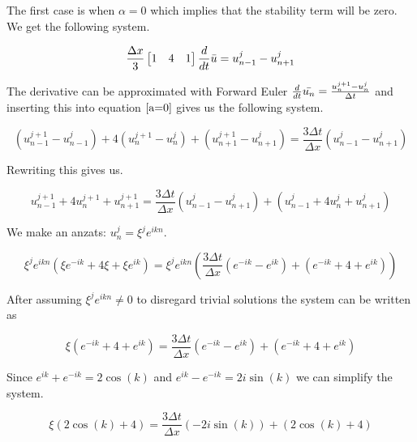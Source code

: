 \documentclass[a4paper,10pt,twoside]{article}
\begin{document}
The first case is when $\alpha = 0$ which implies that the stability term will be zero. We get the following system.

\begin{equation}
\label{a=0}
        \frac{\Delta x}{3}
    \begin{bmatrix}
        1 & 4 & 1
    \end{bmatrix}    
    \frac{d}{dt} \Bar{u} = u_{n-1}^{j} - u_{n+1}^{j}
\end{equation}

The derivative can be approximated with Forward Euler $\frac{d}{dt} \Bar{u_{n}} = \frac{u_n^{j+1} - u_n^j}{\Delta t}$ and inserting this into equation $\ref{a=0}$ gives us the following system.

\begin{equation}
        (u_{n-1}^{j+1} - u_{n-1}^j)
        +4(u_n^{j+1} - u_n^j)
        +(u_{n+1}^{j+1} - u_{n+1}^j)
    = \frac{3 \Delta t}{\Delta x}\left(u_{n-1}^{j} - u_{n+1}^{j}\right)
\end{equation}

Rewriting this gives us.

\begin{equation}
        u_{n-1}^{j+1}
        +4u_n^{j+1} 
        +u_{n+1}^{j+1}
    = \frac{3 \Delta t}{\Delta x}\left(u_{n-1}^{j} - u_{n+1}^{j}\right) + (u_{n-1}^j + 4u_n^j + u_{n+1}^j)
\end{equation}

We make an anzats: $u_n^j = \xi^{j}e^{ikn}$.

\begin{equation}
        \xi^{j}e^{ikn}(\xi e^{-ik}+4\xi+\xi e^{ik}) = \xi^je^{ikn}\left(\frac{3 \Delta t}{ \Delta x}\left(e^{-ik} - e^{ik}\right) + \left(e^{-ik} + 4 + e^{ik}\right)\right)
\end{equation}

After assuming $\xi^je^{ikn} \neq 0$ to disregard trivial solutions the system can be written as


\begin{equation}
        \xi \left(e^{-ik}+4+e^{ik}\right) = \frac{3 \Delta t}{\Delta x}\left(e^{-ik} - e^{ik}\right) + \left(e^{-ik} + 4 + e^{ik}\right)
\end{equation}

Since $e^{ik} + e^{-ik} = 2\cos(k)$ and $e^{ik} - e^{-ik} = 2i \sin(k)$ we can simplify the system.

\begin{equation}
        \xi \left(2\cos(k) +4\right) = \frac{3 \Delta t}{\Delta x}\left(-2i \sin(k)\right) + \left(2\cos(k) + 4\right)
\end{equation}
\end{document}

